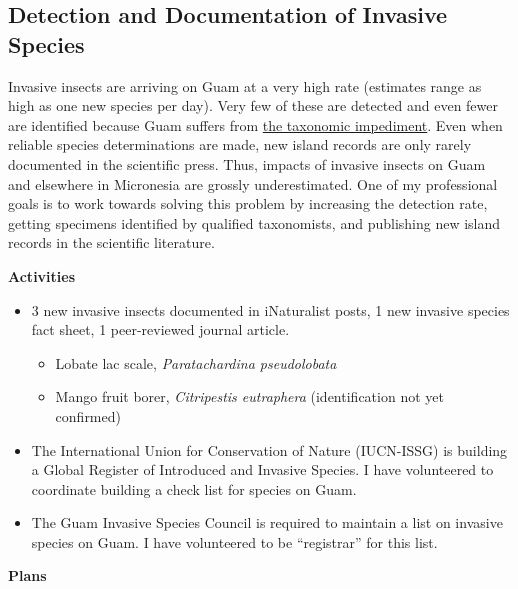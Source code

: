 \documentclass[12pt,english]{scrartcl}
\newcommand{\activities}{\medskip\textbf{Activities}}
\newcommand{\plans}{\medskip\textbf{Plans}}
\begin{document}
\subsection{Detection and Documentation of Invasive Species}
\begin{refsection}

Invasive insects are arriving on Guam at a very high rate (estimates
range as high as one new species per day). Very few of these are detected
and even fewer are identified because Guam suffers from \href{https://en.wikipedia.org/wiki/Taxonomic_impediment}{the taxonomic impediment}.
Even when reliable species determinations are made, new island records
are only rarely documented in the scientific press. Thus, impacts
of invasive insects on Guam and elsewhere in Micronesia are grossly
underestimated. One of my professional goals is to work towards solving
this problem by increasing the detection rate, getting specimens identified
by qualified taxonomists, and publishing new island records in the
scientific literature.

\activities

\begin{itemize}
\item 3 new invasive insects documented in iNaturalist posts, 1 new invasive
species fact sheet, 1 peer-reviewed journal article.

\begin{itemize}

\item Lobate lac scale, \emph{Paratachardina pseudolobata} %
\cite{moore_lobate_2018}

\item Mango fruit borer, \emph{Citripestis eutraphera} (identification not
yet confirmed)~\cite{moore_citripestis_2018, moore_citripestis_2018-1}
\end{itemize}

\item The International Union for Conservation of Nature (IUCN-ISSG) is
building a Global Register of Introduced and Invasive Species. I have
volunteered to coordinate building a check list for species on Guam.

\item The Guam Invasive Species Council is required to maintain a list on
invasive species on Guam. I have volunteered to be ``registrar''
for this list.

\end{itemize}

\plans

\printbibliography
\end{refsection}
\end{document}
